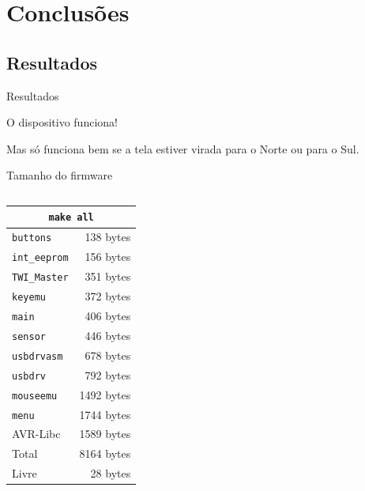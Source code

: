 \documentclass{beamer}
\begin{document}
\section{Conclusões}

\subsection{Resultados}

\begin{frame}{Resultados}
	\pause
	\begin{center}
	\Large{O dispositivo funciona!}
	\end{center}
	\pause
	Mas só funciona bem se a tela estiver virada para o Norte ou para o Sul.
\end{frame}

\begin{frame}[shrink=10]{Tamanho do firmware}
	\begin{columns}
		\begin{center}
			\begin{tabular}{lr}
				\toprule

				\multicolumn{2}{c}{\texttt{make all}} \\

				\midrule

				\texttt{buttons}     &  138 bytes \\
				\texttt{int\_eeprom} &  156 bytes \\
				\texttt{TWI\_Master} &  351 bytes \\
				\texttt{keyemu}      &  372 bytes \\
				\texttt{main}        &  406 bytes \\
				\texttt{sensor}      &  446 bytes \\
				\texttt{usbdrvasm}   &  678 bytes \\
				\texttt{usbdrv}      &  792 bytes \\
				\texttt{mouseemu}    & 1492 bytes \\
				\texttt{menu}        & 1744 bytes \\


				AVR-Libc             & 1589 bytes \\

				\midrule

				Total                & 8164 bytes \\
				Livre                &   28 bytes \\


\end{tabular}
\end{center}
\end{columns}
\end{frame}
\end{document}
